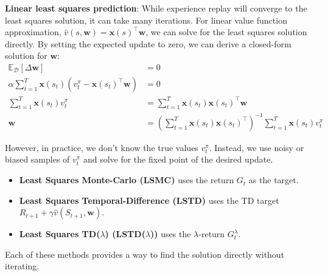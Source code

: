 \noindent \textbf{Linear least squares prediction}: While experience replay will converge to the least squares solution, it can
take many iterations. For linear value function approximation, $\hat{v}(s,
    \mathbf{w}) = \mathbf{x}(s)^\top \mathbf{w}$, we can solve for the least
squares solution directly. By setting the expected update to zero, we can
derive a closed-form solution for $\mathbf{w}$:
\begin{align*}
    \mathbb{E}_\mathcal{D}[\Delta \mathbf{w}]                                       & = 0                                                                                                          \\
    \alpha \sum_{t=1}^T \mathbf{x}(s_t) (v_t^\pi - \mathbf{x}(s_t)^\top \mathbf{w}) & = 0                                                                                                          \\
    \sum_{t=1}^T \mathbf{x}(s_t) v_t^\pi                                            & = \sum_{t=1}^T \mathbf{x}(s_t) \mathbf{x}(s_t)^\top \mathbf{w}                                               \\
    \mathbf{w}                                                                      & = \left( \sum_{t=1}^T \mathbf{x}(s_t) \mathbf{x}(s_t)^\top \right)^{-1} \sum_{t=1}^T \mathbf{x}(s_t) v_t^\pi
\end{align*}

\noindent However, in practice, we don't know the true values $v_t^\pi$. Instead, we use
noisy or biased samples of $v_t^\pi$ and solve for the fixed point of the
desired update.

\begin{itemize}
    \item \textbf{Least Squares Monte-Carlo (LSMC)} uses the return $G_t$ as the target.
    \item \textbf{Least Squares Temporal-Difference (LSTD)} uses the TD target $R_{t+1} + \gamma \hat{v}(S_{t+1}, \mathbf{w})$.
    \item \textbf{Least Squares TD($\lambda$) (LSTD($\lambda$))} uses the $\lambda$-return $G_t^\lambda$.
\end{itemize}

\noindent Each of these methods provides a way to find the solution directly without
iterating.
